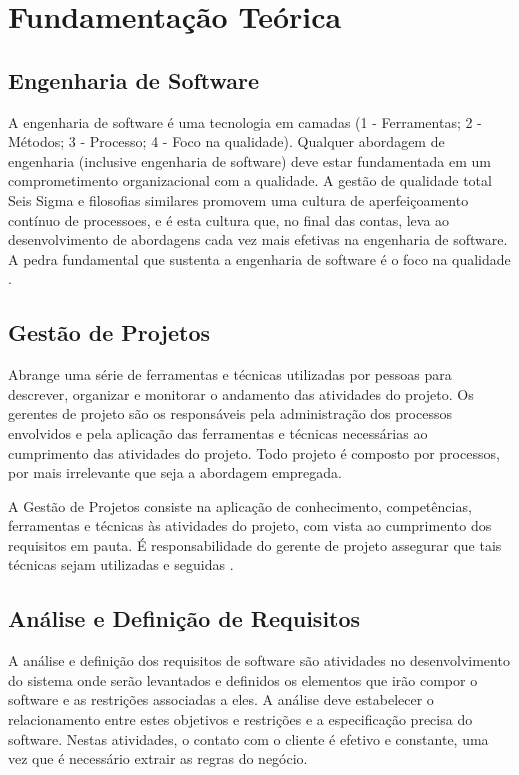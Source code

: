 \chapter{Fundamentação Teórica}
\label{cap:fundamentacaoTeorica}

\section{Engenharia de Software}
\label{sec:engenhariaSoftware}

A engenharia de software é uma tecnologia em camadas (1 - Ferramentas; 2
- Métodos; 3 - Processo; 4 - Foco na qualidade).
Qualquer abordagem de engenharia (inclusive engenharia de software) deve estar fundamentada em um
comprometimento organizacional com a qualidade. A gestão de qualidade total Seis
Sigma e filosofias similares promovem uma cultura de aperfeiçoamento contínuo de
processoes, e é esta cultura que, no final das contas, leva ao desenvolvimento
de abordagens cada vez mais efetivas na engenharia de software. A pedra
fundamental que sustenta a engenharia de software é o foco na qualidade \cite{Pressman:2011}.

\section{Gestão de Projetos}
\label{sec:gestaoProjeto}

Abrange uma série de ferramentas e técnicas utilizadas por pessoas para 
descrever, organizar e monitorar o andamento das atividades do projeto. Os
gerentes de projeto são os responsáveis pela administração dos processos 
envolvidos e pela aplicação das ferramentas e técnicas necessárias ao 
cumprimento das atividades do projeto. Todo projeto é composto por processos,
por mais irrelevante que seja a abordagem empregada. 

A Gestão de Projetos consiste na aplicação de conhecimento, competências, ferramentas e técnicas às
atividades do projeto, com vista ao cumprimento dos requisitos em pauta. É
responsabilidade do gerente de projeto assegurar que tais técnicas sejam
utilizadas e seguidas \cite{Heldman:2011}.

\section{Análise e Definição de Requisitos}
\label{sec:analiseDefinicaoRequisitos}

A análise e definição dos requisitos de software são atividades no
desenvolvimento do sistema onde serão levantados e definidos os elementos que
irão compor o software e as restrições associadas a eles. A análise deve estabelecer
o relacionamento entre estes objetivos e restrições e a especificação precisa do
software. Nestas atividades, o contato com o cliente é efetivo e constante, uma vez
que é necessário extrair as regras do negócio.

